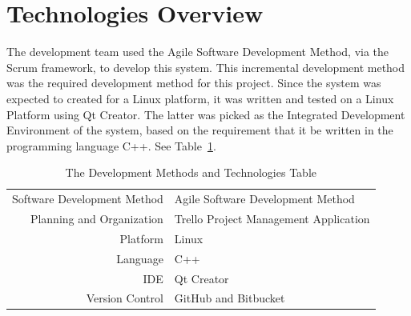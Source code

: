\section{Technologies Overview}
The development team used the Agile Software Development Method, via the Scrum framework, to develop
this system.  This incremental development method was the required development method for this project.
Since the system was expected to created for a Linux platform, it was written and tested on a Linux Platform 
using Qt Creator.  The latter was picked as the Integrated Development Environment of the system, based on
the requirement that it be written in the programming language C++.
See Table~\ref{DevelopmentTable}.  
\begin{table}[tbh]
\begin{center}
\begin{tabular}{|r|l|}
  \hline
  Software Development Method & Agile Software Development Method \\
  Planning and Organization & Trello Project Management Application \\
  \hline \hline
  Platform & Linux \\
  Language & C++ \\  
  IDE & Qt Creator \\
  Version Control & GitHub and Bitbucket
  \\ \cline{2-2}
  
  \hline
\end{tabular}
\caption{The Development Methods and Technologies Table \label{DevelopmentTable}}
\end{center}
\end{table}

